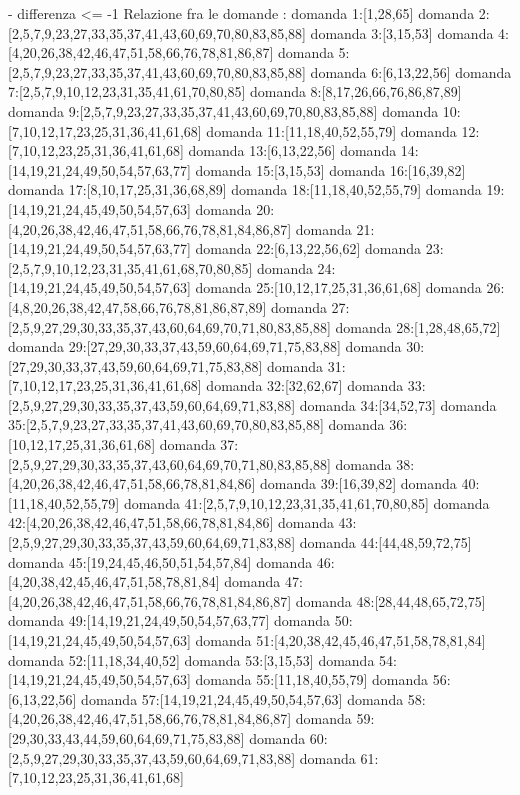 - differenza <= -1
Relazione fra le domande :
domanda 1:[1,28,65]
domanda 2:[2,5,7,9,23,27,33,35,37,41,43,60,69,70,80,83,85,88]
domanda 3:[3,15,53]
domanda 4:[4,20,26,38,42,46,47,51,58,66,76,78,81,86,87]
domanda 5:[2,5,7,9,23,27,33,35,37,41,43,60,69,70,80,83,85,88]
domanda 6:[6,13,22,56]
domanda 7:[2,5,7,9,10,12,23,31,35,41,61,70,80,85]
domanda 8:[8,17,26,66,76,86,87,89]
domanda 9:[2,5,7,9,23,27,33,35,37,41,43,60,69,70,80,83,85,88]
domanda 10:[7,10,12,17,23,25,31,36,41,61,68]
domanda 11:[11,18,40,52,55,79]
domanda 12:[7,10,12,23,25,31,36,41,61,68]
domanda 13:[6,13,22,56]
domanda 14:[14,19,21,24,49,50,54,57,63,77]
domanda 15:[3,15,53]
domanda 16:[16,39,82]
domanda 17:[8,10,17,25,31,36,68,89]
domanda 18:[11,18,40,52,55,79]
domanda 19:[14,19,21,24,45,49,50,54,57,63]
domanda 20:[4,20,26,38,42,46,47,51,58,66,76,78,81,84,86,87]
domanda 21:[14,19,21,24,49,50,54,57,63,77]
domanda 22:[6,13,22,56,62]
domanda 23:[2,5,7,9,10,12,23,31,35,41,61,68,70,80,85]
domanda 24:[14,19,21,24,45,49,50,54,57,63]
domanda 25:[10,12,17,25,31,36,61,68]
domanda 26:[4,8,20,26,38,42,47,58,66,76,78,81,86,87,89]
domanda 27:[2,5,9,27,29,30,33,35,37,43,60,64,69,70,71,80,83,85,88]
domanda 28:[1,28,48,65,72]
domanda 29:[27,29,30,33,37,43,59,60,64,69,71,75,83,88]
domanda 30:[27,29,30,33,37,43,59,60,64,69,71,75,83,88]
domanda 31:[7,10,12,17,23,25,31,36,41,61,68]
domanda 32:[32,62,67]
domanda 33:[2,5,9,27,29,30,33,35,37,43,59,60,64,69,71,83,88]
domanda 34:[34,52,73]
domanda 35:[2,5,7,9,23,27,33,35,37,41,43,60,69,70,80,83,85,88]
domanda 36:[10,12,17,25,31,36,61,68]
domanda 37:[2,5,9,27,29,30,33,35,37,43,60,64,69,70,71,80,83,85,88]
domanda 38:[4,20,26,38,42,46,47,51,58,66,78,81,84,86]
domanda 39:[16,39,82]
domanda 40:[11,18,40,52,55,79]
domanda 41:[2,5,7,9,10,12,23,31,35,41,61,70,80,85]
domanda 42:[4,20,26,38,42,46,47,51,58,66,78,81,84,86]
domanda 43:[2,5,9,27,29,30,33,35,37,43,59,60,64,69,71,83,88]
domanda 44:[44,48,59,72,75]
domanda 45:[19,24,45,46,50,51,54,57,84]
domanda 46:[4,20,38,42,45,46,47,51,58,78,81,84]
domanda 47:[4,20,26,38,42,46,47,51,58,66,76,78,81,84,86,87]
domanda 48:[28,44,48,65,72,75]
domanda 49:[14,19,21,24,49,50,54,57,63,77]
domanda 50:[14,19,21,24,45,49,50,54,57,63]
domanda 51:[4,20,38,42,45,46,47,51,58,78,81,84]
domanda 52:[11,18,34,40,52]
domanda 53:[3,15,53]
domanda 54:[14,19,21,24,45,49,50,54,57,63]
domanda 55:[11,18,40,55,79]
domanda 56:[6,13,22,56]
domanda 57:[14,19,21,24,45,49,50,54,57,63]
domanda 58:[4,20,26,38,42,46,47,51,58,66,76,78,81,84,86,87]
domanda 59:[29,30,33,43,44,59,60,64,69,71,75,83,88]
domanda 60:[2,5,9,27,29,30,33,35,37,43,59,60,64,69,71,83,88]
domanda 61:[7,10,12,23,25,31,36,41,61,68]
